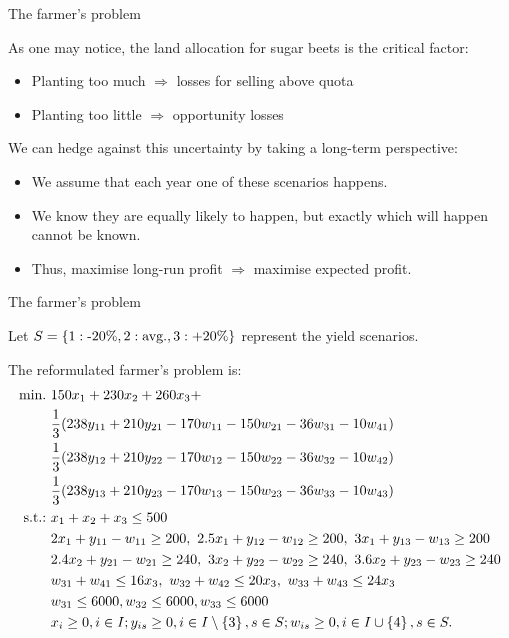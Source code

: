 \begin{frame}{The farmer's problem {\small \cite{birge2011introduction}}}

	As one may notice, the land allocation for sugar beets is the \alert{critical} factor:
	
	\begin{itemize}
		\item Planting too much $\Rightarrow$ losses for selling above quota
		\item Planting too little $\Rightarrow$ opportunity losses
	\end{itemize}
	
	\pause
	We can \alert{hedge} against this uncertainty by taking a \alert{long-term perspective}:
	
	\begin{itemize}
		\item We assume that each year one of these scenarios happens. 
		\item We know they are \alert{equally likely} to happen, but exactly which will happen cannot be known.
		\item Thus, maximise \alert{long-run} profit $\Rightarrow$ maximise \alert{expected profit}.
	\end{itemize}
	
\end{frame}


\begin{frame}{The farmer's problem {\small \cite{birge2011introduction}}}
	
	Let $S = \left\{ 1: \text{-20\%}, 2: \text{avg.}, 3:\text{+20\%} \right \}$ represent the \alert{yield scenarios}. 
	
	The reformulated farmer's problem is:
	{\footnotesize
	\begin{align*}
		\mathop{\text{min.} \ } & 150x_1 + 230 x_2 + 260 x_3 +~ \\
		& \frac{1}{3} (238 y_{11} + 210 y_{21} - 170 w_{11} - 150 w_{21} - 36 w_{31} - 10w_{41})\\
		& \frac{1}{3} (238 y_{12} + 210 y_{22} - 170 w_{12} - 150 w_{22} - 36 w_{32} - 10w_{42})\\
		& \frac{1}{3} (238 y_{13} + 210 y_{23} - 170 w_{13} - 150 w_{23} - 36 w_{33} - 10w_{43})\\
		\text{s.t.:~} & x_1 + x_2 + x_3 \le 500 \\
		&2x_1 + y_{11} - w_{11} \ge 200, \ 2.5x_1 + y_{12} - w_{12} \ge 200, \ 3x_1 + y_{13} - w_{13} \ge 200 \\
		& 2.4 x_2 + y_{21} - w_{21} \ge 240, \ 3 x_2 + y_{22} - w_{22} \ge 240, \ 3.6 x_2 + y_{23} - w_{23} \ge 240 \\
		& w_{31} + w_{41} \le 16x_3, \ w_{32} + w_{42} \le 20x_3, \ w_{33} + w_{43} \le 24x_3 \\
		& w_{31} \le 6000, w_{32} \le 6000, w_{33} \le 6000 \\
		& x_i \ge 0, i \in I; y_{is} \ge 0, i \in I \setminus \left\{ 3 \right \}, s \in S; w_{is} \ge 0, i \in I \cup \left\{ 4 \right \}, s \in S.
	\end{align*}
	}
\end{frame}



